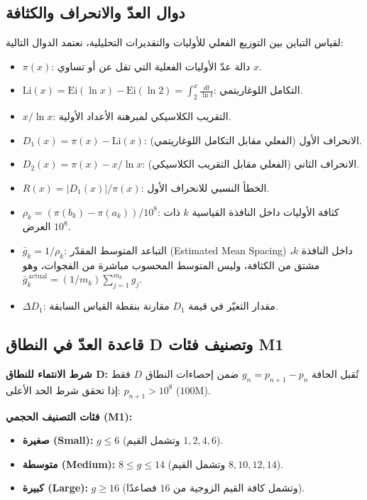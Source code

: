 \documentclass[12pt,a4paper]{article}
\begin{document}
\subsection{دوال العدّ والانحراف والكثافة}
لقياس التباين بين التوزيع الفعلي للأوليات والتقديرات التحليلية، نعتمد الدوال التالية:
\begin{itemize}
    \item $\pi(x)$: دالة عدّ الأوليات الفعلية التي تقل عن أو تساوي $x$.
    \item $\mathrm{Li}(x) = \mathrm{Ei}(\ln x) - \mathrm{Ei}(\ln 2) = \int_2^x \frac{dt}{\ln t}$: التكامل اللوغاريتمي.
    \item $x / \ln x$: التقريب الكلاسيكي لمبرهنة الأعداد الأولية.
    \item $D_1(x) = \pi(x) - \mathrm{Li}(x)$: الانحراف الأول (الفعلي مقابل التكامل اللوغاريتمي).
    \item $D_2(x) = \pi(x) - x/\ln x$: الانحراف الثاني (الفعلي مقابل التقريب الكلاسيكي).
    \item $R(x) = |D_1(x)| / \pi(x)$: الخطأ النسبي للانحراف الأول.
    \item $\rho_k = (\pi(b_k) - \pi(a_k)) / 10^8$: كثافة الأوليات داخل النافذة القياسية $k$ ذات العرض $10^8$.
    \item $\bar{g}_k = 1 / \rho_k$: التباعد المتوسط المقدّر (\textenglish{Estimated Mean Spacing}) داخل النافذة $k$، مشتق من الكثافة، وليس المتوسط المحسوب مباشرة من الفجوات، وهو $\bar{g}_k^{\,\mathrm{actual}} = (1/m_k)\sum_{j=1}^{m_k} g_j$.
    \item $\Delta D_1$: مقدار التغيّر في قيمة $D_1$ مقارنة بنقطة القياس السابقة.
\end{itemize}

\subsection{قاعدة العدّ في النطاق \textenglish{D} وتصنيف فئات \textenglish{M1}}
\textbf{شرط الانتماء للنطاق \textenglish{D}:} تُقبل الحافة $g_n = p_{n+1} - p_n$ ضمن إحصاءات النطاق $D$ فقط إذا تحقق شرط الحد الأعلى: $p_{n+1} > 10^8$ ($100\text{M}$).

\noindent \textbf{فئات التصنيف الحجمي (\textenglish{M1}):}
\begin{itemize}
    \item \textbf{صغيرة (\textenglish{Small}):} $g \leq 6$ (وتشمل القيم $1, 2, 4, 6$).
    \item \textbf{متوسطة (\textenglish{Medium}):} $8 \leq g \leq 14$ (وتشمل القيم $8, 10, 12, 14$).
    \item \textbf{كبيرة (\textenglish{Large}):} $g \geq 16$ (وتشمل كافة القيم الزوجية من $16$ فصاعدًا).
\end{itemize}
\end{document}
